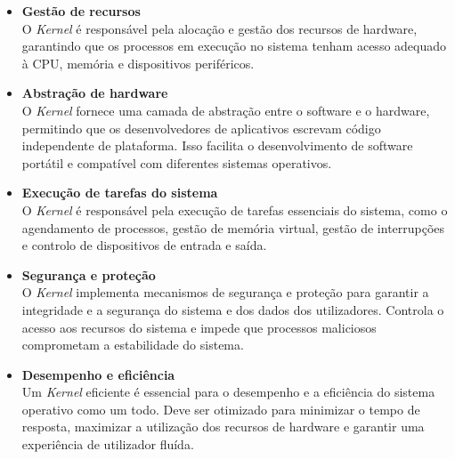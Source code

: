 \begin{itemize}

  \item \textbf{Gestão de recursos}\\
  O \textit{Kernel} é responsável pela alocação e gestão dos recursos de hardware, garantindo que os processos em execução no sistema tenham acesso adequado à CPU, memória e dispositivos periféricos.

  \item \textbf{Abstração de hardware}\\
  O \textit{Kernel} fornece uma camada de abstração entre o software e o hardware, permitindo que os desenvolvedores de aplicativos escrevam código independente de plataforma. Isso facilita o desenvolvimento de software portátil e compatível com diferentes sistemas operativos.

  \item \textbf{Execução de tarefas do sistema}\\
  O \textit{Kernel} é responsável pela execução de tarefas essenciais do sistema, como o agendamento de processos, gestão de memória virtual, gestão de interrupções e controlo de dispositivos de entrada e saída.

  \item \textbf{Segurança e proteção}\\
  O \textit{Kernel} implementa mecanismos de segurança e proteção para garantir a integridade e a segurança do sistema e dos dados dos utilizadores. Controla o acesso aos recursos do sistema e impede que processos maliciosos comprometam a estabilidade do sistema.

  \item \textbf{Desempenho e eficiência}\\
  Um \textit{Kernel} eficiente é essencial para o desempenho e a eficiência do sistema operativo como um todo. Deve ser otimizado para minimizar o tempo de resposta, maximizar a utilização dos recursos de hardware e garantir uma experiência de utilizador fluída.
\end{itemize}
